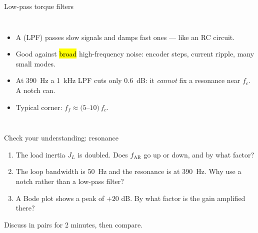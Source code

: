 \documentclass[aspectratio=169,10pt]{beamer}
\newcommand{\dat}[1]{data/#1.dat}
\begin{document}
\begin{frame}{Low-pass torque filters}
\begin{columns}[T]
\centering
{}
\begin{itemize}\small
\item A  (LPF) passes slow signals and damps fast ones --- like an RC circuit.
\item Good against \hl{broad} high-frequency noise: encoder steps, current ripple, many small modes.
\item At \SI{390}{Hz} a \SI{1}{kHz} LPF cuts only \SI{0.6}{dB}: it \emph{cannot} fix a resonance near $f_c$. A notch can.
\item Typical corner: $f_f\approx(5$--$10)\,f_c$.
\end{itemize}
\end{columns}
\end{frame}

\begin{frame}{Check your understanding: resonance}
\begin{keybox}
\large
\begin{enumerate}
\item The load inertia $J_L$ is doubled. Does $f_\text{AR}$ go up or down, and by what factor?
\item The loop bandwidth is \SI{50}{Hz} and the resonance is at \SI{390}{Hz}. Why use a notch rather than a low-pass filter?
\item A Bode plot shows a peak of $+20$ dB. By what factor is the gain amplified there?
\end{enumerate}
\end{keybox}
\vspace{3mm}
{\small\color{mkGray} Discuss in pairs for 2 minutes, then compare.}
\end{frame}
\end{document}

